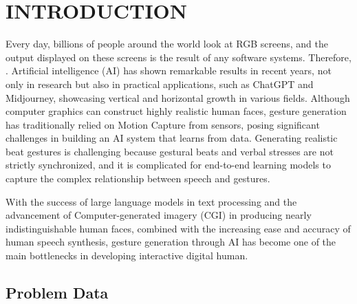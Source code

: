 \section{INTRODUCTION}
\label{sec:introduction}

Every day, billions of people around the world look at RGB screens, and the output displayed on these screens is the result of any software systems. Therefore, . Artificial intelligence (AI) has shown remarkable results in recent years, not only in research but also in practical applications, such as ChatGPT and Midjourney, showcasing vertical and horizontal growth in various fields. Although computer graphics can construct highly realistic human faces, gesture generation has traditionally relied on Motion Capture from sensors, posing significant challenges in building an AI system that learns from data. Generating realistic beat gestures is challenging because gestural beats and verbal stresses are not strictly synchronized, and it is complicated for end-to-end learning models to capture the complex relationship between speech and gestures.

With the success of large language models in text processing and the advancement of Computer-generated imagery (CGI) in producing nearly indistinguishable human faces, combined with the increasing ease and accuracy of human speech synthesis, gesture generation through AI has become one of the main bottlenecks in developing interactive digital human.








\subsection{Problem Data}
\label{sec:Data}

